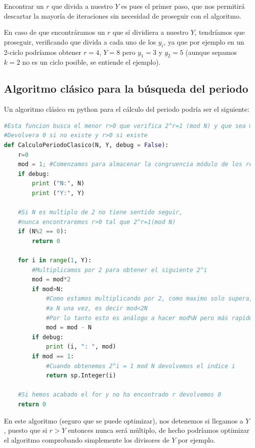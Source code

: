 Encontrar un $r$ que divida a nuestro $Y$ es pues el primer paso, que nos permitirá descartar la mayoría de iteraciones sin necesidad de proseguir con el algoritmo.

En caso de que encontráramos un $r$ que sí dividiera a nuestro $Y$, tendríamos que proseguir, verificando que divida a cada uno de los $y_i$, ya que por ejemplo en un 2-ciclo podríamos obtener $r=4$, $Y=8$ pero $y_1 = 3$ y $y_2 = 5$ (aunque sepamos $k=2$ no es un ciclo posible, se entiende el ejemplo).







\subsection{Algoritmo clásico para la búsqueda del periodo}
Un algoritmo clásico en python para el cálculo del periodo podría ser el siguiente:

\begin{lstlisting}[language=Python]
#Esta funcion busca el menor r>0 que verifica 2^r=1 (mod N) y que sea menor que Y
#Devolvera 0 si no existe y r>0 si existe
def CalculoPeriodoClasico(N, Y, debug = False):
    r=0
    mod = 1; #Comenzamos para almacenar la congruencia módulo de los respectivos 2^i
    if debug:
        print ("N:", N)
        print ("Y:", Y)
        
    #Si N es multiplo de 2 no tiene sentido seguir,
    #nunca encontraremos r>0 tal que 2^r=1(mod N)
    if (N%2 == 0):
        return 0
    
    for i in range(1, Y):
        #Multiplicamos por 2 para obtener el siguiente 2^i
        mod = mod*2
        if mod>N:
            #Como estamos multiplicando por 2, como maximo solo supera,
            #a N una vez, es decir mod<2N
            #Por lo tanto esto es análogo a hacer mod%N pero más rapido
            mod = mod - N
        if debug:
            print (i, ": ", mod)
        if mod == 1:
            #Cuando obtenemos 2^i = 1 mod N devolvemos el indice i
            return sp.Integer(i)
    
    #Si hemos acabado el for y no ha encontrado r devolvemos 0
    return 0
\end{lstlisting}

En este algoritmo (seguro que se puede optimizar), nos detenemos si llegamos a $Y$, puesto que si $r>Y$ entonces nunca será múltiplo, de hecho podríamos optimizar el algoritmo comprobando simplemente los divisores de $Y$ por ejemplo.

